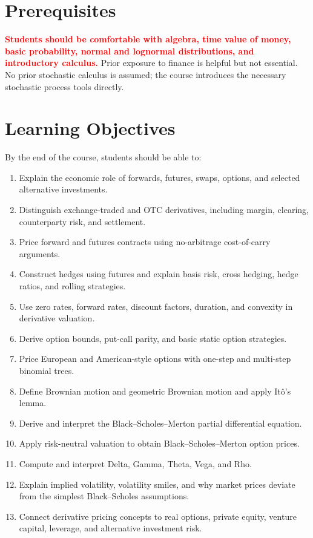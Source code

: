 \documentclass[11pt]{article}
\begin{document}
\section*{Prerequisites}

\textbf{\textcolor{red}{Students should be comfortable with algebra, time value of money, basic probability, normal and lognormal distributions, and introductory calculus.}} Prior exposure to finance is helpful but not essential. No prior stochastic calculus is assumed; the course introduces the necessary stochastic process tools directly.

\section*{Learning Objectives}

By the end of the course, students should be able to:
\begin{enumerate}
    \item Explain the economic role of forwards, futures, swaps, options, and selected alternative investments.
    \item Distinguish exchange-traded and OTC derivatives, including margin, clearing, counterparty risk, and settlement.
    \item Price forward and futures contracts using no-arbitrage cost-of-carry arguments.
    \item Construct hedges using futures and explain basis risk, cross hedging, hedge ratios, and rolling strategies.
    \item Use zero rates, forward rates, discount factors, duration, and convexity in derivative valuation.
    \item Derive option bounds, put-call parity, and basic static option strategies.
    \item Price European and American-style options with one-step and multi-step binomial trees.
    \item Define Brownian motion and geometric Brownian motion and apply It\^o's lemma.
    \item Derive and interpret the Black--Scholes--Merton partial differential equation.
    \item Apply risk-neutral valuation to obtain Black--Scholes--Merton option prices.
    \item Compute and interpret Delta, Gamma, Theta, Vega, and Rho.
    \item Explain implied volatility, volatility smiles, and why market prices deviate from the simplest Black--Scholes assumptions.
    \item Connect derivative pricing concepts to real options, private equity, venture capital, leverage, and alternative investment risk.
\end{enumerate}
\end{document}
